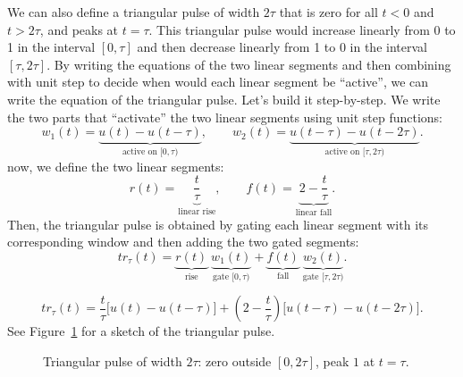We can also define a triangular pulse of width $2\tau$ that is zero for all $t < 0$ and $t > 2\tau$, and peaks at $t = \tau$. This triangular pulse would increase linearly from 0 to 1 in the interval $[0, \tau]$ and then decrease linearly from 1 to 0 in the interval $[\tau, 2\tau]$. By writing the equations of the two linear segments and then combining with unit step to decide when would each linear segment be ``active'', we can write the equation of the triangular pulse. Let's build it step-by-step. We write the two parts that ``activate'' the two linear segments using unit step functions:
\[
w_1(t)=\underbrace{u(t)-u(t-\tau)}_{\text{active on }[0,\tau)},\qquad
w_2(t)=\underbrace{u(t-\tau)-u(t-2\tau)}_{\text{active on }[\tau,2\tau)}.
\]
now, we define the two linear segments:
\[
r(t)=\underbrace{\frac{t}{\tau}}_{\text{linear rise}},\qquad
f(t)=\underbrace{2-\frac{t}{\tau}}_{\text{linear fall}}.
\]
Then, the triangular pulse is obtained by gating each linear segment with its corresponding window and then adding the two gated segments:
\[
tr_\tau(t)
=\underbrace{r(t)}_{\text{rise}}\;\underbrace{w_1(t)}_{\text{gate }[0,\tau)}
+\underbrace{f(t)}_{\text{fall}}\;\underbrace{w_2(t)}_{\text{gate }[\tau,2\tau)}.
\]

\[
tr_\tau(t)
=\frac{t}{\tau}\big[u(t)-u(t-\tau)\big]
+\left(2-\frac{t}{\tau}\right)\big[u(t-\tau)-u(t-2\tau)\big].
\]
See Figure~\ref{fig:tri_pulse} for a sketch of the triangular pulse.
\begin{figure}[h!]
  \centering
  \caption{Triangular pulse of width $2\tau$: zero outside $[0,2\tau]$, peak $1$ at $t=\tau$.}
  \label{fig:tri_pulse}
\end{figure}

